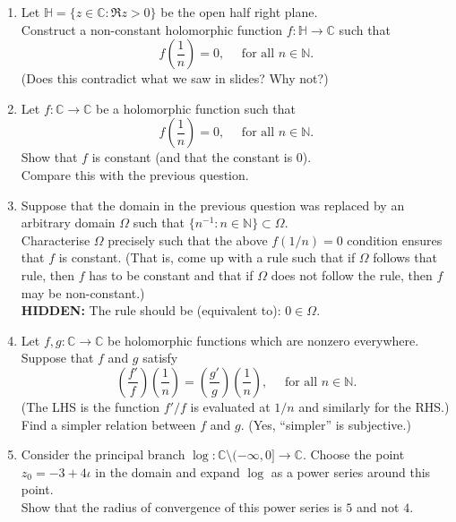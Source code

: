 \documentclass[12pt]{article}
\theoremstyle{definition}
\numberwithin{thm}{section}
\newcommand{\hint}[1]{\textbf{HIDDEN:} {\color[rgb]{0.95, 0.95, 0.95}#1}}
\begin{document}
\begin{enumerate}
	\item Let $\mathbb{H} = \{z \in \mathbb{C} : \Re z > 0\}$ be the open half right plane.\\
	Construct a non-constant holomorphic function $f:\mathbb{H} \to \mathbb{C}$ such that
	\begin{equation*} 
		f\left(\dfrac{1}{n}\right) = 0, \quad \text{ for all } n \in \mathbb{N}.
	\end{equation*}
	(Does this contradict what we saw in slides? Why not?)
	\item Let $f:\mathbb{C} \to \mathbb{C}$ be a holomorphic function such that
	\begin{equation*} 
		f\left(\dfrac{1}{n}\right) = 0, \quad \text{ for all } n \in \mathbb{N}.
	\end{equation*}
	Show that $f$ is constant (and that the constant is $0$).\\
	Compare this with the previous question.
	\item Suppose that the domain in the previous question was replaced by an arbitrary domain $\Omega$ such that $\{n^{-1} : n \in \mathbb{N}\} \subset \Omega.$\\
	Characterise $\Omega$ precisely such that the above $f(1/n) = 0$ condition ensures that $f$ is constant. (That is, come up with a rule such that if $\Omega$ follows that rule, then $f$ has to be constant and that if $\Omega$ does not follow the rule, then $f$ may be non-constant.)\\
	\hint{The rule should be (equivalent to): $0 \in \Omega.$}
	\item Let $f, g:\mathbb{C} \to \mathbb{C}$ be holomorphic functions which are nonzero everywhere. Suppose that $f$ and $g$ satisfy
	\begin{equation*} 
		\left(\dfrac{f'}{f}\right)\left(\dfrac{1}{n}\right) = \left(\dfrac{g'}{g}\right)\left(\dfrac{1}{n}\right), \quad \text{ for all } n \in \mathbb{N}.
	\end{equation*}
	(The LHS is the function $f'/f$ is evaluated at $1/n$ and similarly for the RHS.)\\
	Find a simpler relation between $f$ and $g.$ (Yes, ``simpler'' is subjective.)
	\item Consider the principal branch $\log:\mathbb{C}\setminus(-\infty, 0] \to \mathbb{C}.$ Choose the point $z_0 = -3 + 4\iota$ in the domain and expand $\log$ as a power series around this point.\\
	Show that the radius of convergence of this power series is $5$ and not $4.$
\end{enumerate}
\end{document}
